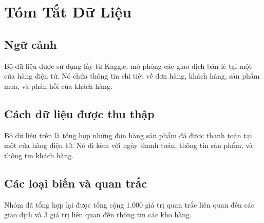 \section{Tóm Tắt Dữ Liệu}

\subsection{Ngữ cảnh}
Bộ dữ liệu được sử dụng lấy từ Kaggle, mô phỏng các giao dịch bán lẻ tại một cửa hàng điện tử. Nó chứa thông tin chi tiết về đơn hàng, khách hàng, sản phẩm mua, và phản hồi của khách hàng.

\subsection{Cách dữ liệu được thu thập}
Bộ dữ liệu trên là tổng hợp những đơn hàng sản phẩm đã được thanh toán tại một cửa hàng điện tử. Nó đi kèm với ngày thanh toán, thông tin sản phẩm, và thông tin khách hàng.

\subsection{Các loại biến và quan trắc}
Nhóm đã tổng hợp lại được tổng cộng 1,000 giá trị quan trắc liên quan đến các giao dịch và 3 giá trị liên quan đến thông tin các kho hàng.

